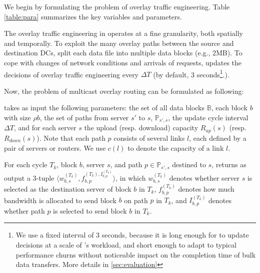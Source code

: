 We begin by formulating the problem of overlay traffic engineering. 
Table \ref{table:para} summarizes the key variables and parameters. 

The overlay traffic engineering in \name operates at a 
fine granularity, both spatially and temporally. To exploit the many
overlay paths between the source and destination DCs, \name split 
each data file into multiple data blocks (e.g., 2MB). 
To cope with changes of network conditions and arrivals of requests, 
\name updates the decisions of overlay traffic engineering every 
$\Delta T$ (by default, 3 seconds\footnote{We use a fixed interval of
3 seconds, because it is long enough for \name to update decisions at
a scale of \company's workload, and short enough to adapt to typical 
performance churns without noticeable impact on the completion time 
of bulk data transfers. 
More details in \Section\ref{sec:evaluation}}.). 


Now, the problem of multicast overlay routing can be formulated as 
following:

 \name takes as input the following parameters: 
the set of all data blocks $\mathbb{B}$, each block $b$ with size 
$\rho{b}$, the set of paths from server $s'$ to $s$, 
$\mathbb{P}_{s',s}$, the update cycle interval $\Delta T$, and for 
each server $s$ the upload (resp. download) capacity $R_{up}(s)$ 
(resp. $R_{down}(s)$). Note that each path $p$ consists of several 
links $l$, each defined by a pair of servers or routers. We use 
$c(l)$ to denote the capacity of a link $l$.

 For each cycle $T_{k}$, block $b$, server $s$, and 
path $p\in\mathbb{P}_{s',s}$ destined to $s$, \name returns as output
a 3-tuple $\langle w^{(T_k)}_{b,s}, f_{b,p}^{(T_k), I^{(T_k)}_{b,p}} 
\rangle$, in which $w^{(T_k)}_{b,s}$ denotes whether server $s$ is 
selected as the destination server of block $b$ in $T_k$, 
$f_{b,p}^{(T_k)}$ denotes how much bandwidth is allocated to send 
block $b$ on path $p$ in $T_k$, and $I^{(T_k)}_{b,p}$ denotes whether
path $p$ is selected to send block $b$ in $T_k$.

